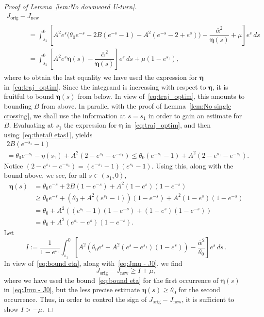 \documentclass[AHL,Unicode,longabstracts]{cedram}
\newcommand{\orig}{\mathrm{orig}}
\newcommand{\new}{\mathrm{new}}
\newcommand{\beeta}{\boldsymbol{\eta}}
\newcommand{\1}{\mathds{1}}
\begin{document}
\begin{proof}[Proof of Lemma~\ref{lem:No downward U-turn}]
\begin{multline}\label{eq:Jmu - J0}
J_{\orig} - J_{\new} \\
\begin{aligned}
&\qquad = \int_{s_1}^0 \left[A^2 e^s \bigg(\theta_0 e^{-s} - 2 B \left (e^{-s} - 1 \right) - A^2 \left (e^{-s} - 2 + e^s\right)\bigg) - \dfrac{\overline\alpha^2}{\beeta(s)} + \mu\right] e^s\, ds\\
&\qquad = \int_{s_1}^0 \left[A^2 e^s \beeta(s) - \dfrac{\overline\alpha^2}{\beeta(s)} \right] e^s\, ds + \mu\left(1 - e^{s_1}\right),
\end{aligned}
\end{multline}
where to obtain the last equality we have used the expression for $\beeta$ in~\eqref{eq:traj_optim}. Since the integrand is increasing with respect to $\beeta$, it is fruitful to bound $\beeta(s)$ from below. In view of~\eqref{eq:traj_optim}, this amounts to bounding $B$ from above. In parallel with the proof of Lemma~\ref{lem:No single crossing}, we shall use the information at $s = s_1$ in order to gain an estimate for $B$. Evaluating at $s_1$ the expression for $\beeta$ in~\eqref{eq:traj_optim}, and then using~\eqref{eq:theta0 etas1}, yields
\begin{multline*}
2B\left (e^{-s_1} - 1\right) \\
= \theta_0 e^{-s_1} - \eta(s_1) + A ^2 \left(2 - e^{s_1} - e^{-s_1}\right)
\leq \theta_0 \left(e^{-s_1} - 1\right) + A ^2 \left(2 - e^{s_1} - e^{-s_1}\right).
\end{multline*}
Notice $(2- e^{s_1}-e^{-s_1}) = (e^{-s_1}-1)(e^{s_1}-1)$. Using this, along with the bound above, we see, for all $s \in (s_1,0)$,
\begin{equation}\label{eq:bound eta}
\begin{split}
\beeta(s) &= \theta_0 e^{-s} + 2 B\left(1-e^{-s}\right) + A^2 \left(1- e^s\right)\left(1-e^{-s}\right)\\
& \geq \theta_0 e^{-s} + \left(\theta_0 + A ^2\left(e^{s_1} - 1\right)\right) \left(1 - e^{-s}\right) + A ^2 \left(1- e^s\right)\left(1-e^{-s}\right)\\
& = \theta_0 + A^2\left(\left(e^{s_1}-1\right) \left(1- e^{-s} \right) + \left(1- e^s\right)\left(1-e^{-s}\right)\right)\\
& = \theta_0 + A^2 \left(e^{s_1} - e^s \right) \left(1 - e^{-s} \right).
\end{split}
\end{equation}
Let
\[
I := \dfrac{1}{1 - e^{s_1}} \int_{s_1}^0 \left[A^2 \left(\theta_0 e^s + A^2 \left(e^{s} - e^{s_1} \right) \left(1 - e^{s} \right) \right) - \dfrac{\overline\alpha^2}{\theta_0 } \right] e^s\, ds\,.
\]
In view of~\eqref{eq:bound eta}, along with~\eqref{eq:Jmu - J0}, we find
\[
J_{\orig} - J_{\new} \geq I + \mu,
\]
where we have used the bound~\eqref{eq:bound eta} for the first occurrence of $\beeta(s)$ in~\eqref{eq:Jmu - J0}, but the less precise estimate $\beeta(s)\geq \theta_0$ for the second occurrence. Thus, in order to control the sign of $J_{\orig} - J_{\new}$, it is sufficient to show $I > -\mu$.




\end{proof}
\end{document}

